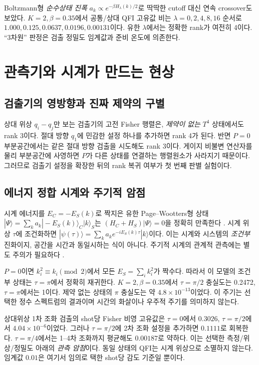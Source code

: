 \documentclass[11pt,a4paper]{article}
\begin{document}
Boltzmann형 \emph{순수상태 진폭} $a_k\propto e^{-\beta H_\lambda(k)/2}$로
딱딱한 cutoff 대신 연속 crossover도 보았다. $K=2,\beta=0.35$에서
공통/상대 QFI 고유값 비는 $\lambda=0,2,4,8,16$ 순서로
$1.000,0.125,0.0637,0.0196,0.00131$이다. 유한 $\lambda$에서는
정확한 rank가 여전히 4이다. ``3차원'' 판정은 검출 정밀도 임계값과
준비 온도에 의존한다.

\section{관측기와 시계가 만드는 현상}
\subsection{검출기의 영방향과 진짜 제약의 구별}
상대 위상 $q_i-q_j$만 보는 검출기의 고전 Fisher 행렬은,
\emph{제약이 없는} $T^4$ 상태에서도 rank 3이다. 절대 방향
$q_1$에 민감한 설정 하나를 추가하면 rank 4가 된다. 반면 $P=0$
부분공간에서는 같은 절대 방향 검출을 시도해도 rank 3이다.
게이지 비불변 연산자를 물리 부분공간에 사영하면 $P$가 다른 상태를
연결하는 행렬원소가 사라지기 때문이다. 그러므로 검출기 설정을
확장한 뒤의 rank 복귀 여부가 첫 번째 판별 실험이다.

\subsection{에너지 정합 시계와 주기적 암점}
시계 에너지를 $E_C=-E_S(k)$로 짝지은 유한 Page--Wootters형
상태 $|\Psi\rangle=\sum_k a_k|-E_S(k)\rangle_C|k\rangle_S$는
$(H_C+H_S)|\Psi\rangle=0$을 정확히 만족한다 \cite{PW1983}.
시계 위상 $\tau$에 조건화하면
$|\psi(\tau)\rangle=\sum_k a_k e^{-iE_S(k)\tau}|k\rangle$이다.
이는 시계와 시스템의 \emph{조건부} 진화이지, 공간을 시간과
동일시하는 식이 아니다. 주기적 시계의 관계적 관측에는 별도 주의가
필요하다 \cite{PeriodicClock2026}.

$P=0$이면 $k_i^2\equiv k_i\pmod2$에서 모든 $E_S=\sum_i k_i^2$가
짝수다. 따라서 이 모델의 조건부 상태는 $\tau=\pi$에서 정확히
재귀한다. $K=2,\beta=0.35$에서 $\tau=\pi/2$ 충실도는 0.2472,
$\tau=\pi$에서는 1이다. 제약 없는 상태의 $\pi$ 충실도는
약 $4.8\times10^{-13}$이었다. 이 주기는 선택한 정수 스펙트럼의
결과이며 시간의 화살이나 우주적 주기를 의미하지 않는다.

상대위상 1차 조화 검출의 shot당 Fisher 비영 고유값은
$\tau=0$에서 $0.3026$, $\tau=\pi/2$에서 $4.04\times10^{-6}$이었다.
그러나 $\tau=\pi/2$에 2차 조화 설정을 추가하면 $0.1111$로 회복한다.
$\tau=\pi/4$에서는 1--4차 조화까지 평균해도 $0.00187$로 약하다.
이는 선택한 측정/위상/정밀도 아래의 \emph{관측 암점}이다.
동일 상태의 QFI는 시계 위상으로 소멸하지 않는다.
임계값 $0.01$은 여기서 임의로 택한 shot당 감도 기준일 뿐이다.
\end{document}
